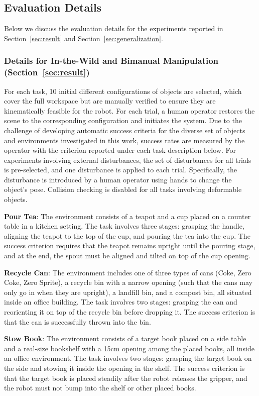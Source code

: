 \subsection{Evaluation Details}\label{app:tasks}

Below we discuss the evaluation details for the experiments reported in Section~\ref{sec:result} and Section~\ref{sec:generalization}.

\subsubsection{Details for In-the-Wild and Bimanual Manipulation (Section~\ref{sec:result})}
For each task, 10 initial different configurations of objects are selected, which cover the full workspace but are manually verified to ensure they are kinematically feasible for the robot. For each trial, a human operator restores the scene to the corresponding configuration and initiates the system. Due to the challenge of developing automatic success criteria for the diverse set of objects and environments investigated in this work, success rates are measured by the operator with the criterion reported under each task description below. For experiments involving external disturbances, the set of disturbances for all trials is pre-selected, and one disturbance is applied to each trial. Specifically, the disturbance is introduced by a human operator using hands to change the object's pose. Collision checking is disabled for all tasks involving deformable objects.

\textbf{Pour Tea}: The environment consists of a teapot and a cup placed on a counter table in a kitchen setting. The task involves three stages: grasping the handle, aligning the teapot to the top of the cup, and pouring the tea into the cup. The success criterion requires that the teapot remains upright until the pouring stage, and at the end, the spout must be aligned and tilted on top of the cup opening.

\textbf{Recycle Can}: The environment includes one of three types of cans (Coke, Zero Coke, Zero Sprite), a recycle bin with a narrow opening (such that the cans may only go in when they are upright), a landfill bin, and a compost bin, all situated inside an office building. The task involves two stages: grasping the can and reorienting it on top of the recycle bin before dropping it. The success criterion is that the can is successfully thrown into the bin.

\textbf{Stow Book}: The environment consists of a target book placed on a side table and a real-size bookshelf with a 15cm opening among the placed books, all inside an office environment. The task involves two stages: grasping the target book on the side and stowing it inside the opening in the shelf. The success criterion is that the target book is placed steadily after the robot releases the gripper, and the robot must not bump into the shelf or other placed books.

